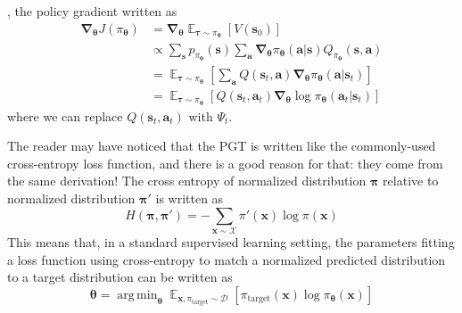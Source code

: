 \documentclass{article}
\DeclareMathOperator*{\argmin}{arg\,min}
\begin{document}
\cite{sutton_barto_rl}, the policy gradient written as\begin{equation}\begin{split}\boldsymbol{\nabla}_{\boldsymbol{\theta}}J(\pi_{\boldsymbol{\theta}})&=\boldsymbol{\nabla}_{\boldsymbol{\theta}}\mathop{\mathbb{E}}_{\boldsymbol{\tau}\sim\pi_{\boldsymbol{\theta}}}[V(\mathbf{s}_0)]\\&\propto\sum_\mathbf{s}p_{\pi_{\boldsymbol{\theta}}}(\mathbf{s})\sum_\mathbf{a}\boldsymbol{\nabla}_{\boldsymbol{\theta}}\pi_{\boldsymbol{\theta}}(\mathbf{a}|\mathbf{s})Q_{\pi_{\boldsymbol{\theta}}}(\mathbf{s},\mathbf{a})\\&=\mathop{\mathbb{E}}_{\boldsymbol{\tau}\sim\pi_{\boldsymbol{\theta}}}\left[\sum_\mathbf{a}Q(\mathbf{s}_t, \mathbf{a})\boldsymbol{\nabla}_{\boldsymbol{\theta}}\pi_{\boldsymbol{\theta}}(\mathbf{a}|\mathbf{s}_t)\right]\\&=\mathop{\mathbb{E}}_{\boldsymbol{\tau}\sim\pi_{\boldsymbol{\theta}}}\left[Q(\mathbf{s}_t, \mathbf{a}_t)\boldsymbol{\nabla}_{\boldsymbol{\theta}}\log\pi_{\boldsymbol{\theta}}(\mathbf{a}_t|\mathbf{s}_t)\right]\end{split}\end{equation}where we can replace $Q(\mathbf{s}_t,\mathbf{a}_t)$ with $\Psi_t$.

The reader may have noticed that the PGT is written like the commonly-used cross-entropy loss function, and there is a good reason for that: they come from the same derivation! The cross entropy of normalized distribution $\boldsymbol{\pi}$ relative to normalized distribution $\boldsymbol{\pi}'$ is written as \begin{equation}\label{eq:cross-entropy}
H(\boldsymbol{\pi},\boldsymbol{\pi}')=-\sum_{\mathbf{x}\sim\mathcal{X}}\pi'(\mathbf{x})\log\pi(\mathbf{x})
\end{equation}This means that, in a standard supervised learning setting, the parameters fitting a loss function using cross-entropy to match a normalized predicted distribution to a target distribution can be written as 
\begin{equation}
\boldsymbol{\theta}=\argmin_{\boldsymbol{\theta}}\mathop{\mathbb{E}}_{\mathbf{x},\pi_\text{target}\sim\mathcal{D}}\left[\pi_\text{target}(\mathbf{x})\log \pi_{\boldsymbol{\theta}}(\mathbf{x})\right]   
\end{equation} 
\end{document}
